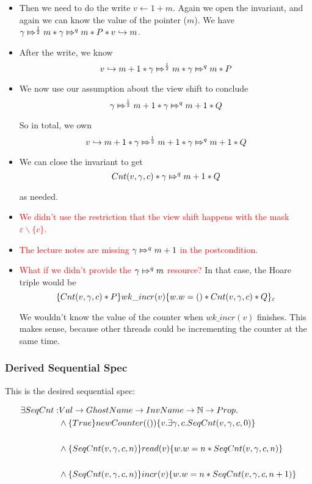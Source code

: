 \begin{enumerate}
\begin{itemize}
\item Then we need to do the write $v \gets 1 + m$. Again we open the invariant, and again we can know the value of the pointer ($m$). We have $\apointsto{\gamma}{m}{\frac{1}{2}} * \apointsto{\gamma}{m}{q} * P * \pointsto{v}{m}$.

\item After the write, we know
\[
 \pointsto{v}{m + 1} * \apointsto{\gamma}{m}{\frac{1}{2}} * \apointsto{\gamma}{m}{q} * P
\]

\item We now use our assumption about the view shift to conclude 
\[
\apointsto{\gamma}{m + 1}{\frac{1}{2}} * \apointsto{\gamma}{m + 1}{q} * Q
\]

So in total, we own
\[
 \pointsto{v}{m + 1}  * \apointsto{\gamma}{m + 1}{\frac{1}{2}} * \apointsto{\gamma}{m + 1}{q} * Q
\]

\item We can close the invariant to get
\[
\Cnt{v}{\gamma}{c} * \apointsto{\gamma}{m + 1}{q} * Q
\]

as needed.

\item \textcolor{red}{We didn't use the restriction that the view shift happens with the mask $\varepsilon \backslash \{ c \}$.}

\item \textcolor{red}{The lecture notes are missing $\apointsto{\gamma}{m + 1}{q}$ in the postcondition.}

\item \textcolor{red}{What if we didn't provide the $\apointsto{\gamma}{m}{q}$ resource?}  In that case, the Hoare triple would be
\[
\hot{\Cnt{v}{\gamma}{c} * P}{wk\_incr(v)}{w. w = () * \Cnt{v}{\gamma}{c} * Q}_{\varepsilon}
\]

We wouldn't know the value of the counter when $wk\_incr(v)$ finishes. This makes sense, because other threads could be incrementing the counter at the same time.

\end{itemize}

\end{enumerate}

\subsubsection{Derived Sequential Spec}

This is the desired sequential spec:

\begin{align*}
\exists SeqCnt : & Val \rightarrow GhostName \rightarrow InvName \rightarrow \mathbb{N} \rightarrow Prop.\\
& \land \hot{True}{ newCounter(())}{v. \exists \gamma, c. \SCnt{v}{\gamma}{c}{0}} \\
\\
& \land \hot{\SCnt{v}{\gamma}{c}{n}}{read(v)}{w. w = n * \SCnt{v}{\gamma}{c}{n}} \\
\\
& \land \hot{\SCnt{v}{\gamma}{c}{n}}{incr(v)}{w. w = n * \SCnt{v}{\gamma}{c}{n + 1}} \\
\end{align*}

